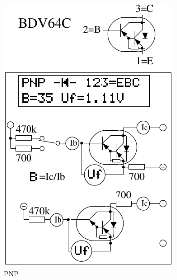 \begin{figure}[H]
  \begin{subfigure}[b]{.5\textwidth}
    \centering
    \includegraphics[width=1.\textwidth]{../FIG/BJT_BDV64.pdf}
    \caption{PNP}
    \label{fig:BJT-PNP-Darl-R-D}
  \end{subfigure}
  ~
  \begin{subfigure}[b]{.5\textwidth}
    \centering

\end{subfigure}
\end{figure}
